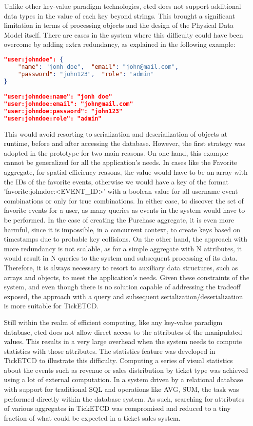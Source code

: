 \documentclass[screen,review]{acmart}
\begin{document}
Unlike other key-value paradigm technologies, etcd does not support additional data types in the value of each key beyond strings. This brought a significant limitation in terms of processing objects and the design of the Physical Data Model itself. There are cases in the system where this difficulty could have been overcome by adding extra redundancy, as explained in the following example:

\begin{lstlisting}[language=json]
"user:johndoe": { 
    "name": "jonh doe",  "email": "john@mail.com", 
    "password": "john123",  "role": "admin"
}

"user:johndoe:name": "jonh doe"
"user:johndoe:email": "john@mail.com"
"user:johndoe:password": "john123"
"user:johndoe:role": "admin"
\end{lstlisting}

This would avoid resorting to serialization and deserialization of objects at runtime, before and after accessing the database. However, the first strategy was adopted in the prototype for two main reasons. On one hand, this example cannot be generalized for all the application's needs. In cases like the Favorite aggregate, for spatial efficiency reasons, the value would have to be an array with the IDs of the favorite events, otherwise we would have a key of the format 'favorite:johndoe:<EVENT\_ID>' with a boolean value for all username-event combinations or only for true combinations. In either case, to discover the set of favorite events for a user, as many queries as events in the system would have to be performed. In the case of creating the Purchase aggregate, it is even more harmful, since it is impossible, in a concurrent context, to create keys based on timestamps due to probable key collisions. On the other hand, the approach with more redundancy is not scalable, as for a simple aggregate with N attributes, it would result in N queries to the system and subsequent processing of its data. Therefore, it is always necessary to resort to auxiliary data structures, such as arrays and objects, to meet the application's needs. Given these constraints of the system, and even though there is no solution capable of addressing the tradeoff exposed, the approach with a query and subsequent serialization/deserialization is more suitable for TickETCD.

Still within the realm of efficient computing, like any key-value paradigm database, etcd does not allow direct access to the attributes of the manipulated values. This results in a very large overhead when the system needs to compute statistics with those attributes. The statistics feature was developed in TickETCD to illustrate this difficulty. Computing a series of visual statistics about the events such as revenue or sales distribution by ticket type was achieved using a lot of external computation. In a system driven by a relational database with support for traditional SQL and operations like AVG, SUM, the task was performed directly within the database system.
As such, searching for attributes of various aggregates in TickETCD was compromised and reduced to a tiny fraction of what could be expected in a ticket sales system.
\end{document}
